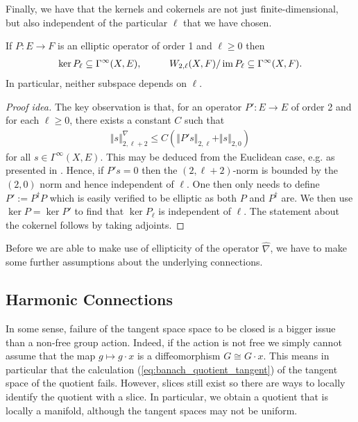 \documentclass[12pt]{ociamthesis}  %
\begin{document}
Finally, we have that the kernels and cokernels are not just
finite-dimensional, but also independent of the particular $\ell$
that we have chosen.

\begin{theorem}\label{eq:independence_of_l}
  If $P:E\to F$ is an elliptic operator of order 1
  and $\ell\geq 0$ then
  \begin{align*}
    \ker P_\ell \subseteq \Gamma^\infty(X,E),\hspace{1cm}
    W_{2,\ell}(X,F)/\operatorname{im} P_\ell \subseteq \Gamma^\infty(X,F).
  \end{align*}
  In particular, neither subspace depends on $\ell$.
  \begin{proof}[Proof idea]
    The key observation is that, for an operator
    $P':E\to E$ of order 2 and for each $\ell\geq 0$,
    there exists a constant $C$ such that
    \begin{align*}
      \Vert s\Vert^\nabla_{2,\ell+2} \leq C(\Vert P's\Vert_{2,\ell} + \Vert s\Vert_{2,0})
    \end{align*}
    for all $s\in\Gamma^\infty(X,E)$.
    This may be deduced from the Euclidean case, e.g. as presented in
    \cite[6.3.1 Theorem 2]{evans1998}. Hence, if $P's = 0$ then the
    $(2,\ell+2)$-norm is bounded
    by the $(2,0)$ norm and hence independent of $\ell$.
    One then only needs to define $P' := P^\dagger P$ which is easily
    verified to be elliptic as both $P$ and $P^\dagger$ are. We then
    use $\ker P = \ker P'$
    to find that $\ker P_\ell$ is independent of $\ell$. The
    statement about the cokernel follows by taking adjoints.
  \end{proof}
\end{theorem}

Before we are able to make use of ellipticity of the operator
$\hat\nabla$, we have to make some further assumptions about the
underlying connections.

\subsection{Harmonic Connections}

In some sense, failure of the tangent space space to be closed is a bigger issue
than a non-free group action. Indeed, if the action is not free we simply cannot
assume that the map $g\mapsto g\cdot x$ is a diffeomorphism $G\cong G\cdot x$.
This means in particular that the calculation (\ref{eq:banach_quotient_tangent})
of the tangent space of the quotient fails. However, slices still exist so there
are ways to locally identify the quotient with a slice. In particular, we obtain
a quotient that is locally a manifold, although the tangent spaces may not be
uniform.
\end{document}

